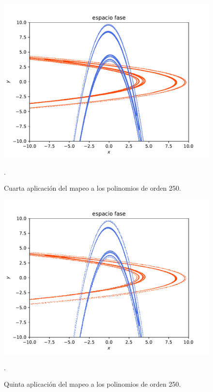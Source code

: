 \documentclass[11pt]{beamer}
\theoremstyle{definition}
\begin{document}
\begin{frame}
\begin{figure}[h!]
\centering
\includegraphics[scale=0.6]{rectangulo4.pdf}
\caption{Cuarta aplicación del mapeo a los polinomios de orden 250.}.
\label{Rectangulo4}
\end{figure}
\end{frame}
\begin{frame}
\begin{figure}[H]
\centering
\includegraphics[scale=0.6]{rectangulo5.pdf}
\caption{Quinta aplicación del mapeo a los polinomios de orden 250.}.
\label{Rectangulo5}
\end{figure}
\end{frame}
\end{document}
